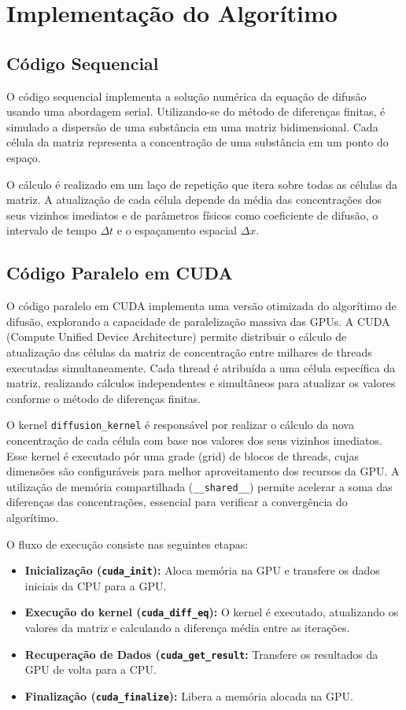 \documentclass[12pt]{article}
\begin{document}
\section{Implementação do Algorítimo}

\subsection{Código Sequencial}

O código sequencial implementa a solução numérica da equação de difusão usando
uma abordagem serial. Utilizando-se do método de diferenças finitas, é simulado
a dispersão de uma substância em uma matriz bidimensional. Cada célula da
matriz representa a concentração de uma substância em um ponto do espaço.

O cálculo é realizado em um laço de repetição que itera sobre todas as células
da matriz. A atualização de cada célula depende da média das concentrações dos
seus vizinhos imediatos e de parâmetros físicos como coeficiente de difusão, o
intervalo de tempo $\Delta t$ e o espaçamento espacial $\Delta x$.

\subsection{Código Paralelo em CUDA}

O código paralelo em CUDA implementa uma versão otimizada do algorítimo de difusão, explorando a capacidade de paralelização massiva das GPUs. A CUDA (Compute Unified Device Architecture) permite distribuir o cálculo de atualização das células da matriz de concentração entre milhares de threads executadas simultaneamente. Cada thread é atribuída a uma célula específica da matriz, realizando cálculos independentes e simultâneos para atualizar os valores conforme o método de diferenças finitas.

O kernel \texttt{diffusion\_kernel} é responsável por realizar o cálculo da nova concentração de cada célula com base nos valores dos seus vizinhos imediatos. Esse kernel é executado pór uma grade (grid) de blocos de threads, cujas dimensões são configuráveis para melhor aproveitamento dos recursos da GPU. A utilização de memória compartilhada (\texttt{\_\_shared\_\_}) permite acelerar a soma das diferenças das concentrações, essencial para verificar a convergência do algorítimo.

O fluxo de execução consiste nas seguintes etapas:

\begin{itemize}
    \item \textbf{Inicialização (\texttt{cuda\_init}):} Aloca memória na GPU e transfere os dados iniciais da CPU para a GPU.
    \item \textbf{Execução do kernel (\texttt{cuda\_diff\_eq}):} O kernel é executado, atualizando os valores da matriz e calculando a diferença média entre as iterações.
    \item \textbf{Recuperação de Dados (\texttt{cuda\_get\_result}:} Transfere os resultados da GPU de volta para a CPU.
    \item \textbf{Finalização (\texttt{cuda\_finalize}):} Libera a memória alocada na GPU.
\end{itemize}
\end{document}
